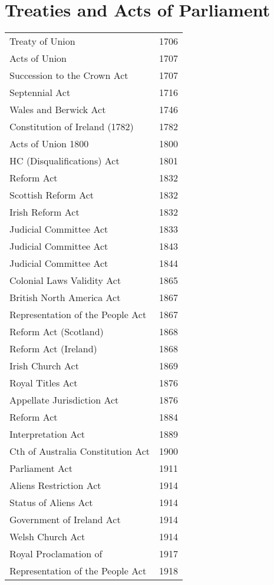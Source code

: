 \documentclass[14pt,titlepage]{extarticle}
\begin{document}
\pagebreak
\section{Treaties and Acts of Parliament}\label{ActList}

{\small
\begin{longtable}{l l}
Treaty of Union & 1706\\
Acts of Union & 1707\\
Succession to the Crown Act &  1707\\
Septennial Act & 1716\\
Wales and Berwick Act & 1746\\
Constitution of Ireland (1782) & 1782\\
Acts of Union 1800 & 1800\\
HC (Disqualifications) Act &  1801\\
Reform Act &  1832\\
Scottish Reform Act  & 1832\\
Irish Reform Act  & 1832\\
Judicial Committee Act  & 1833\\
Judicial Committee Act  & 1843\\
Judicial Committee Act  & 1844\\
Colonial Laws Validity Act & 1865\\
British North America Act  & 1867\\
Representation of the People Act &  1867\\
Reform Act (Scotland)  & 1868\\
Reform Act (Ireland)  & 1868\\
Irish Church Act & 1869\\
Royal Titles Act  & 1876\\
Appellate Jurisdiction Act & 1876\\
Reform Act  & 1884\\
Interpretation Act  & 1889\\
Cth of Australia Constitution Act & 1900\\
Parliament Act & 1911\\
Aliens Restriction Act & 1914\\
Status of Aliens Act  & 1914\\
Government of Ireland Act  & 1914\\
Welsh Church Act & 1914\\
Royal Proclamation of  & 1917\\
Representation of the People Act &  1918\\

\end{longtable}}
\end{document}
